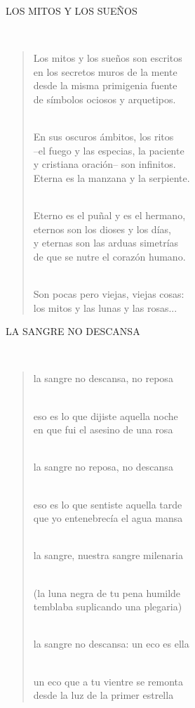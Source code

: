 \documentclass[a4paper, 12pt]{article}
\begin{document}
\pagebreak
\centerline{LOS MITOS Y LOS SUEÑOS}
~ 

\begin{verse}
    
Los mitos y los sueños son escritos\\
en los secretos muros de la mente\\
desde la misma primigenia fuente\\
de símbolos ociosos y arquetipos.\\
~ 

En sus oscuros ámbitos, los ritos\\
–el fuego y las especias, la paciente\\
y cristiana oración– son infinitos.\\
Eterna es la manzana y la serpiente.\\
~ 

Eterno es el puñal y es el hermano,\\
eternos son los dioses y los días,\\
y eternas son las arduas simetrías\\
de que se nutre el corazón humano.\\
~ 

Son pocas pero viejas, viejas cosas:\\
los mitos y las lunas y las rosas...\\
\end{verse}

\pagebreak
\centerline{LA SANGRE NO DESCANSA}
~ 

\begin{verse}
    
la sangre no descansa, no reposa\\
~ 

eso es lo que dijiste aquella noche\\
en que fui el asesino de una rosa\\
~ 

la sangre no reposa, no descansa\\
~ 

eso es lo que sentiste aquella tarde\\
que yo entenebrecía el agua mansa\\
~ 

la sangre, nuestra sangre milenaria\\
~ 

(la luna negra de tu pena humilde\\
temblaba suplicando una plegaria)\\
~ 

la sangre no descansa: un eco es ella\\
~ 

un eco que a tu vientre se remonta\\
desde la luz de la primer estrella\\
\end{verse}
\end{document}
